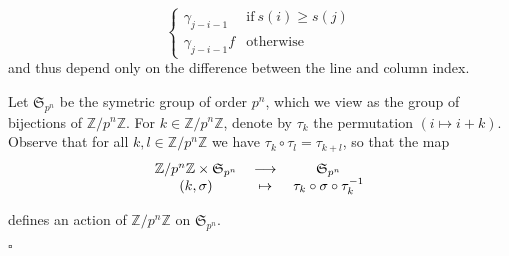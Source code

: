 \documentclass{amsart}
\newenvironment{demo}{{\flushleft \bf Proof~:}}{\hfill $\square$ \vspace{5mm}}
\theoremstyle{definition}
\theoremstyle{remark}
\begin{document}
\begin{demo}
\[\begin{cases}
 \gamma_{j-i-1} & \mbox{if} \ s(i) \geq s(j) \\
 \gamma_{j-i-1}f & \mbox{otherwise} 
 \end{cases}
 \] and thus depend only on the difference between the line and column index.

Let ${{\mathfrak S}}_{p^n}$ be the symetric group of order $p^n$, which we view as the group of bijections of ${\mathbb{Z}} / p^n {\mathbb{Z}}$. For $k \in {\mathbb{Z}} / p^n {\mathbb{Z}}$, denote by $\tau_k$ the permutation $(i \mapsto i +k)$. Observe that for all $k,l \in {\mathbb{Z}} / p^n {\mathbb{Z}}$ we have $\tau_k \circ \tau_l = \tau_{k+l}$, so that the map  
\[ \begin{tabular}{ccc}

${\mathbb{Z}} / p^n {\mathbb{Z}} \times {{\mathfrak S}}_{p^n}$ & ${\longrightarrow}$ & ${{\mathfrak S}}_{p^n}$ \\ 

$(k,\sigma)$ & $\mapsto$ & $\tau_k \circ \sigma \circ \tau_k^{-1}$ \\ 

\end{tabular} \]

defines an action of ${\mathbb{Z}}/ p^n {\mathbb{Z}}$ on ${{\mathfrak S}}_{p^n}$. 


\end{demo}
\end{document}
